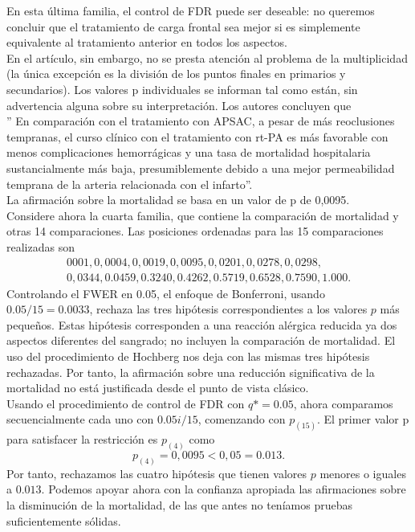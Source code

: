\documentclass[11pt,letterpaper]{article}
\begin{document}
En esta última familia, el control de FDR puede ser deseable: no queremos concluir que el tratamiento de carga frontal sea mejor si es simplemente equivalente al tratamiento anterior en todos los aspectos.\\

En el artículo, sin embargo, no se presta atención al problema de la multiplicidad (la única excepción es la división de los puntos finales en primarios y secundarios). Los valores p individuales se informan tal como están, sin advertencia alguna sobre su interpretación. Los autores concluyen que\\

'' En comparación con el tratamiento con APSAC, a pesar de más reoclusiones tempranas, el curso clínico con el tratamiento con rt-PA es más favorable con menos complicaciones hemorrágicas y una tasa de mortalidad hospitalaria sustancialmente más baja, presumiblemente debido a una mejor permeabilidad temprana de la arteria relacionada con el infarto''.\\

La afirmación sobre la mortalidad se basa en un valor de p de 0,0095.\\
Considere ahora la cuarta familia, que contiene la comparación de mortalidad y otras 14 comparaciones. Las posiciones ordenadas para las 15 comparaciones realizadas son \begin{align*}
0001, 0,0004, 0,0019, 0,0095, 0,0201, 0,0278, 0,0298,\\ 0,0344, 0.0459, 0.3240, 0.4262, 0.5719, 0.6528, 0.7590, 1.000.
\end{align*}
Controlando el FWER en 0.05, el enfoque de Bonferroni, usando $0.05 / 15 = 0.0033$, rechaza las tres hipótesis correspondientes a los valores $p$ más pequeños. Estas hipótesis corresponden a una reacción alérgica reducida ya dos aspectos diferentes del sangrado; no incluyen la comparación de mortalidad. El uso del procedimiento de Hochberg nos deja con las mismas tres hipótesis rechazadas. Por tanto, la afirmación sobre una reducción significativa de la mortalidad no está justificada desde el punto de vista clásico.\\
Usando el procedimiento de control de FDR con $q * = 0.05$, ahora comparamos secuencialmente cada uno con $0.05i / 15$, comenzando con $p_{(15)}$. El primer valor p para satisfacer la restricción es $p_{(4)}$ como
$$p_{(4)} = 0,0095 <0,05 = 0.013.$$
Por tanto, rechazamos las cuatro hipótesis que tienen valores $p$ menores o iguales a $0.013$. Podemos apoyar ahora con la confianza apropiada las afirmaciones sobre la disminución de la mortalidad, de las que antes no teníamos pruebas suficientemente sólidas.
\end{document}
